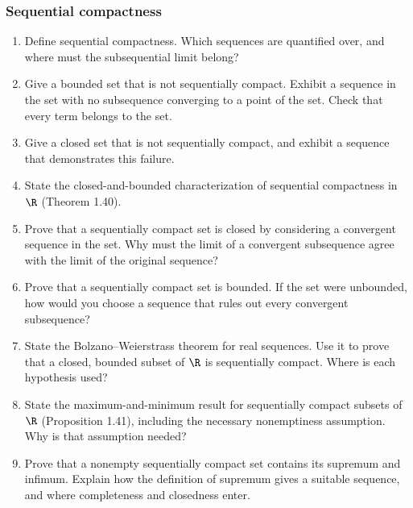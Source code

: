 \subsubsection*{Sequential compactness}
\begin{enumerate}[resume]
  \item Define sequential compactness. Which sequences are quantified
    over, and where must the subsequential limit belong?

  \item Give a bounded set that is not sequentially compact.
    Exhibit a sequence in the set with no subsequence converging to a
    point of the set. Check that every term belongs to the set.

  \item Give a closed set that is not sequentially compact, and exhibit
    a sequence that demonstrates this failure.

  \item State the closed-and-bounded characterization of sequential
    compactness in \(\R\) (Theorem 1.40).

  \item Prove that a sequentially compact set is closed by considering
    a convergent sequence in the set. Why must the limit of a convergent
    subsequence agree with the limit of the original sequence?

  \item Prove that a sequentially compact set is bounded.
    If the set were unbounded, how would you choose a sequence that
    rules out every convergent subsequence?

  \item State the Bolzano--Weierstrass theorem for real sequences.
    Use it to prove that a closed, bounded subset of \(\R\) is
    sequentially compact. Where is each hypothesis used?

  \item State the maximum-and-minimum result for sequentially compact
    subsets of \(\R\) (Proposition 1.41), including the necessary
    nonemptiness assumption. Why is that assumption needed?

  \item Prove that a nonempty sequentially compact set contains its
    supremum and infimum. Explain how the definition of supremum gives
    a suitable sequence, and where completeness and closedness enter.
\end{enumerate}

